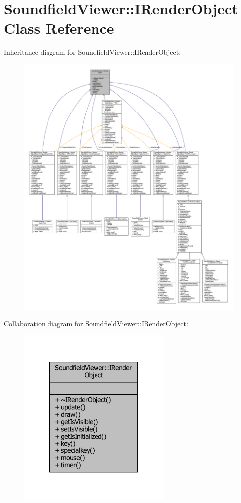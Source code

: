 \section{Soundfield\-Viewer\-:\-:I\-Render\-Object Class Reference}
\label{classSoundfieldViewer_1_1IRenderObject}


Inheritance diagram for Soundfield\-Viewer\-:\-:I\-Render\-Object\-:\nopagebreak
\begin{figure}[H]
\begin{center}
\leavevmode
\includegraphics[width=350pt]{df/d56/classSoundfieldViewer_1_1IRenderObject__inherit__graph}
\end{center}
\end{figure}


Collaboration diagram for Soundfield\-Viewer\-:\-:I\-Render\-Object\-:\nopagebreak
\begin{figure}[H]
\begin{center}
\leavevmode
\includegraphics[width=212pt]{d4/dd3/classSoundfieldViewer_1_1IRenderObject__coll__graph}
\end{center}
\end{figure}
